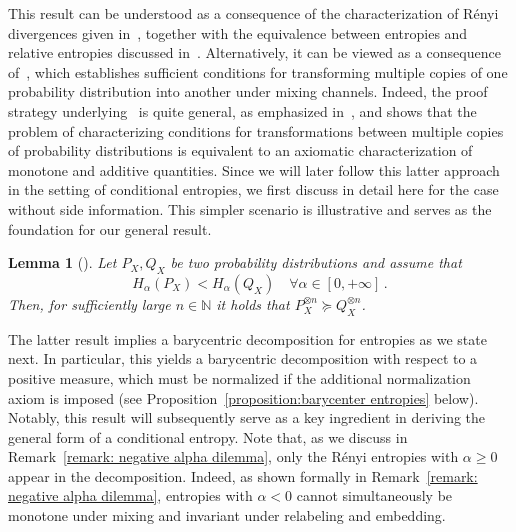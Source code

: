 \documentclass[aps,pra,11pt,onecolumn,nofootinbib,tightenlines]{revtex4-2}
\newtheorem{lemma}[theorem]{Lemma}
\theoremstyle{definition}
\begin{document}
This result can be understood as a consequence of the characterization of Rényi divergences given in~\cite[Theorem~2]{mu21_renyi}, together with the equivalence between entropies and relative entropies discussed in~\cite{gour21_axiomatic}. Alternatively, it can be viewed as a consequence of~\cite[Proposition~3.7]{Jensen_Kjaerulf_2019}, which establishes sufficient conditions for transforming multiple copies of one probability distribution into another under mixing channels.
Indeed, the proof strategy underlying~\cite[Theorem~2]{mu21_renyi} is quite general, as emphasized in~\cite{haapasalo_inprep}, and shows that the problem of characterizing conditions for transformations between multiple copies of probability distributions is equivalent to an axiomatic characterization of monotone and additive quantities. Since we will later follow this latter approach in the setting of conditional entropies, we first discuss in detail here for the case without side information. This simpler scenario is illustrative and serves as the foundation for our general result.
\begin{lemma}[{\cite[Proposition 3.7]{Jensen_Kjaerulf_2019}}]\label{lemma:Jensen}
Let $P_X,Q_X$ be two probability distributions and assume that
\begin{equation}
    H_\alpha(P_X) < H_\alpha(Q_X)  \quad \forall \alpha\in[0,+\infty] \,.
\end{equation}
Then, for sufficiently large $n \in \mathbb{N}$ it holds that
$P_X^{\otimes n} \succeq Q_X^{\otimes n}$.
\end{lemma}
The latter result implies a barycentric decomposition for entropies as we state next.
In particular, this yields a barycentric decomposition with respect to a positive measure, which must be normalized if the additional normalization axiom is imposed (see Proposition~\ref{proposition:barycenter entropies} below).
 Notably, this result will subsequently serve as a key ingredient in deriving the general form of a conditional entropy.  Note that, as we discuss in Remark~\ref{remark: negative alpha dilemma}, only the Rényi entropies with
$\alpha \geq 0$ appear in the decomposition. Indeed, as shown formally in Remark~\ref{remark: negative alpha dilemma}, entropies with $\alpha<0$ cannot simultaneously be monotone under mixing and invariant under relabeling and embedding.
\end{document}
